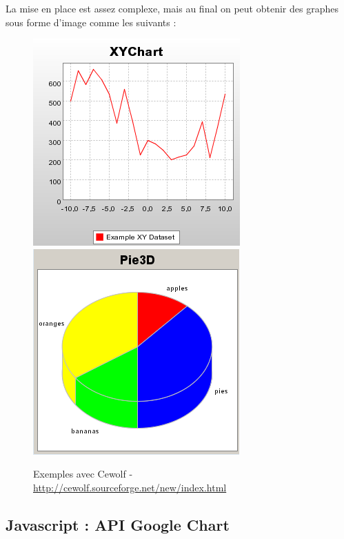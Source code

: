 La mise en place est assez complexe, mais au final on peut obtenir des graphes sous forme d'image comme les suivants :
\begin{figure}[H]
  \center
  \includegraphics[scale=0.5]{../graph/cewolfEx1.png}
  \includegraphics[scale=0.5]{../graph/cewolfEx2.png} 
  \caption{Exemples avec Cewolf - \url{http://cewolf.sourceforge.net/new/index.html}}
\end{figure}

\subsection{Javascript : API Google Chart}
